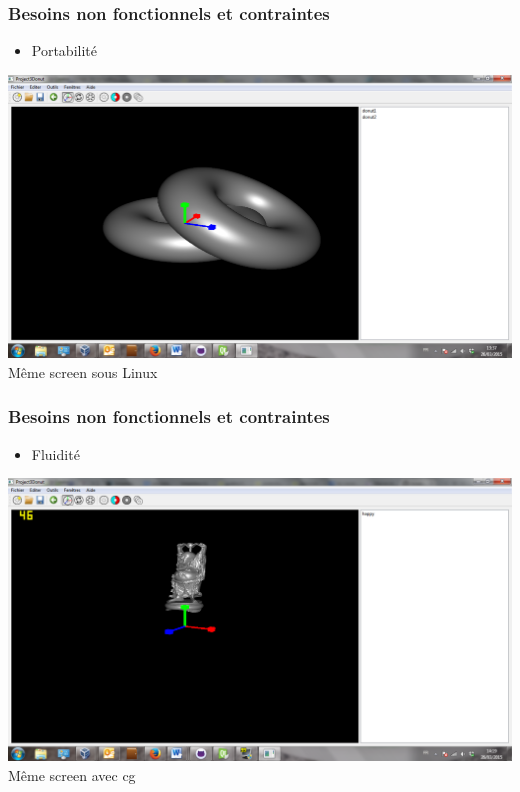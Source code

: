 \documentclass{beamer}
\begin{document}

\begin{frame}
\frametitle{Besoins non fonctionnels et contraintes}
\begin{itemize}[label=$\bullet$]
\item Portabilité
\end{itemize}
\centering
\includegraphics[scale=0.7]{portabilite.png}
\\
Même screen sous Linux 
\end{frame}


\begin{frame}
\frametitle{Besoins non fonctionnels et contraintes}
\begin{itemize}[label=$\bullet$]
\item Fluidité
\end{itemize}
\centering
\includegraphics[scale=0.7]{fluidite.png}
\\
Même screen avec cg 
\end{frame}
\end{document}
